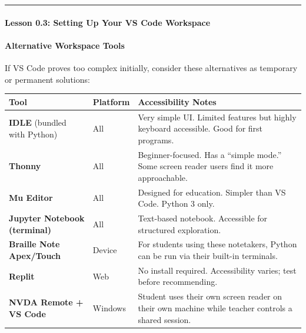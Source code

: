 \documentclass[
  justified,
  openright,
]{tufte-book}
\let\subsection\paragraph
\let\paragraph\paragraph
\let\subsection\paragraph
\let\paragraph\paragraph
\begin{document}
\begin{center}\rule{0.5\linewidth}{0.5pt}\end{center}

\subsection{Lesson 0.3: Setting Up Your VS Code
Workspace}\label{lesson-0.3-setting-up-your-vs-code-workspace}

\paragraph{Alternative Workspace
Tools}\label{alternative-workspace-tools}

If VS Code proves too complex initially, consider these alternatives as
temporary or permanent solutions:

\begin{fullwidth}{\def\LTcaptype{none} %
\begin{longtable}[]{@{}
  >{\raggedright\arraybackslash}p{}
  >{\raggedright\arraybackslash}p{}
  >{\raggedright\arraybackslash}p{}@{}}
\toprule\noalign{}
\begin{minipage}[b]{\linewidth}\raggedright
Tool
\end{minipage} & \begin{minipage}[b]{\linewidth}\raggedright
Platform
\end{minipage} & \begin{minipage}[b]{\linewidth}\raggedright
Accessibility Notes
\end{minipage} \\
\midrule\noalign{}
\endhead
\bottomrule\noalign{}
\endlastfoot
\textbf{IDLE} (bundled with Python) & All & Very simple UI. Limited
features but highly keyboard accessible. Good for first programs. \\
\textbf{Thonny} & All & Beginner-focused. Has a ``simple mode.'' Some
screen reader users find it more approachable. \\
\textbf{Mu Editor} & All & Designed for education. Simpler than VS Code.
Python 3 only. \\
\textbf{Jupyter Notebook (terminal)} & All & Text-based notebook.
Accessible for structured exploration. \\
\textbf{Braille Note Apex/Touch} & Device & For students using these
notetakers, Python can be run via their built-in terminals. \\
\textbf{Replit} & Web & No install required. Accessibility varies; test
before recommending. \\
\textbf{NVDA Remote + VS Code} & Windows & Student uses their own screen
reader on their own machine while teacher controls a shared session. \\
\end{longtable}
}
\end{fullwidth}
\end{document}
